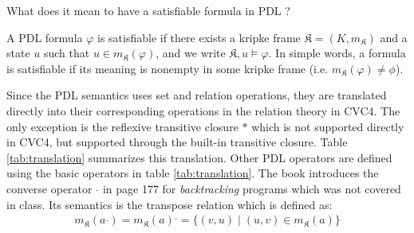 \documentclass[12pt,a4paper]{article}
\begin{document}
What does it mean to have a satisfiable formula in PDL ?

A PDL formula $\varphi$ is satisfiable if there exists a kripke frame $\mathfrak{K}=(K, m_{\mathfrak{K}})$ and a state  $u$ such that $u \in m_{\mathfrak{K}}(\varphi) $, and we write $\mathfrak{K}, u \models \varphi$. In simple words, a formula is satisfiable if its meaning is nonempty in some kripke frame (i.e. $m_{\mathfrak{K}}(\varphi) \neq \phi$). 

Since the PDL semantics uses set and relation operations, they are translated directly into their corresponding operations in the relation theory in CVC4. The only exception is the reflexive transitive closure $*$ which is not supported directly in CVC4, but supported through the built-in transitive closure. Table \ref{tab:translation} summarizes this translation. Other PDL operators are defined using the basic operators in table \ref{tab:translation}. The book \cite{dynamic} introduces the converse operator $^{\_}$ in page 177 for \textit{backtracking} programs which was not covered in class. Its semantics is the transpose relation which is defined as:
\begin{align*}
m_{\mathfrak{K}}(a^{\_}) = m_{\mathfrak{K}}(a)^{\_} = \lbrace (v, u) \; \vert \; (u, v) \in m_{\mathfrak{K}}(a) \rbrace
\end{align*}
\end{document}
